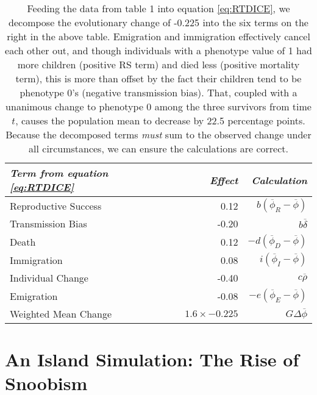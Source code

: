 \documentclass[11pt]{article}
\begin{document}
	\begin{table}[htbp]
  \begin{footnotesize}
  \begin{center}
  \begin{tabular}{lrr}
    
  \textit{Term from equation \ref{eq:RTDICE}} & \textit{Effect} & \textit{Calculation}\\
  \hline
	Reproductive Success & 0.12	&	$b(\overline{\phi}_{R} - \overline{\phi})$ \\
	Transmission Bias & -0.20	&	$b\overline{\delta}$ \\
	Death & 0.12	&	$-d(\overline{\phi}_D - \overline{\phi})$ \\
	Immigration & 0.08	&	$i(\overline{\phi}_I - \overline{\phi})$\\
	Individual Change &	-0.40	&	$c\overline{\rho}$ \\
	Emigration & -0.08	&	$-e(\overline{\phi}_E - \overline{\phi})$\\
	\hline
	Weighted Mean Change & $1.6 \times -0.225$ &	$G \Delta \overline{\phi}$\\
  
  \end{tabular}%
  \caption{Feeding the data from table 1 into equation \ref{eq:RTDICE}, we decompose the evolutionary change of -0.225 into the six terms on the right in the above table.  Emigration and immigration effectively cancel each other out, and though individuals with a phenotype value of 1 had more children (positive RS term) and died less (positive mortality term), this is more than offset by the fact their children tend to be phenotype 0's (negative transmission bias).  That, coupled with a unanimous change to phenotype 0 among the three survivors from time $t$, causes the population mean to decrease by 22.5 percentage points.  Because the decomposed terms \textit{must} sum to the observed change under all circumstances, we can ensure the calculations are correct.}
  \label{tab:DemoDecomp}
  \end{center}
  \end{footnotesize}
	\end{table}%
	
	
\section{An Island Simulation: The Rise of Snoobism}
\end{document}
